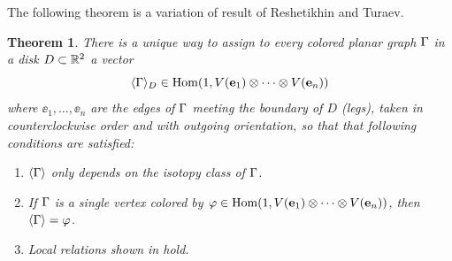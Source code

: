 \documentclass{amsart}
\newtheorem{thm}{Theorem}[section]
\DeclareMathOperator{\Hom}{Hom}
\begin{document}
The following theorem is a variation of result of Reshetikhin and Turaev. 
\begin{thm}\label{t:RT}
  There is a unique  way to assign to every colored
  planar graph $\Gamma$ in a disk $D\subset \mathbb{R}^2$ a vector
  \begin{equation}
    \<\Ga\>_D\in \Hom (1, V(\ee_1) \otimes \dots \otimes V(\ee_n))
  \end{equation}
  where $\ee_1,\dots, \ee_n$ are the edges of $\Gamma$ meeting the boundary
  of $D$ (legs), taken in counterclockwise order and with outgoing orientation,
  so that that following conditions are satisfied:
  \begin{enumerate}
     \item $\langle\Gamma\rangle$ only depends on the isotopy  class of $\Gamma$.

    \item If $\Gamma$ is a single vertex colored by
          $\ph\in \Hom (1, V(\ee_1) \otimes \dots \otimes V(\ee_n))$, then $\langle\Gamma\rangle=\varphi$.
     
    \item Local relations shown in  hold. 




\end{enumerate}
\end{thm}
\end{document}
